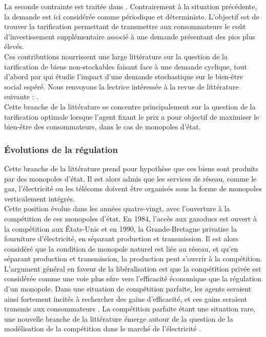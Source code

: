 La seconde contrainte est traitée dans \cite{boiteux1960peak}. Contrairement à la situation précédente, la demande est ici considérée comme périodique et déterministe. L'objectif est de trouver la tarification permettant de transmettre aux consommateurs le coût d'investissement supplémentaire associé à une demande présentant des pics plus élevés.\\

Ces contributions nourrissent une large littérature sur la question de la tarification de biens non-stockables faisant face à une demande cyclique, tout d'abord par \cite{brown1969public} qui étudie l'impact d'une demande stochastique sur le bien-être social espéré. Nous renvoyons la lectrice intéressée à la revue de littérature suivante : \cite{crew1995theory}.\\

Cette branche de la littérature se concentre principalement sur la question de la tarification optimale lorsque l'agent fixant le prix a pour objectif de maximiser le bien-être des consommateurs, dans le cas de monopoles d'état.\\

\subsubsection*{Évolutions de la régulation}
Cette branche de la littérature prend pour hypothèse que ces biens sont produits par des monopoles d'état. Il est alors admis que les services de réseau, comme le gaz, l'électricité ou les télécoms doivent être organisés sous la forme de monopoles verticalement intégrés.\\

Cette position évolue dans les années quatre-vingt, avec l'ouverture à la compétition de ces monopoles d'état. En 1984, l'accès aux gazoducs est ouvert à la compétition aux États-Unis et en 1990, la Grande-Bretagne privatise la fourniture d'électricité, en séparant production et transmission. Il est alors considéré que la condition de monopole naturel est liée au réseau, et qu'en séparant production et transmission, la production peut s'ouvrir à la compétition.\\

L'argument général en faveur de la libéralisation est que la compétition privée est considérée comme une voie plus sûre vers l'efficacité économique que la régulation d'un monopole. Dans une situation de compétition parfaite, les agents seraient ainsi fortement incités à rechercher des gains d'efficacité, et ces gains seraient transmis aux consommateurs \cite{schmidt1996costs}. La compétition parfaite étant une situation rare, une nouvelle branche de la littérature émerge autour de la question de la modélisation de la compétition dans le marché de l'électricité \cite{newbery1997privatisation}. \\

